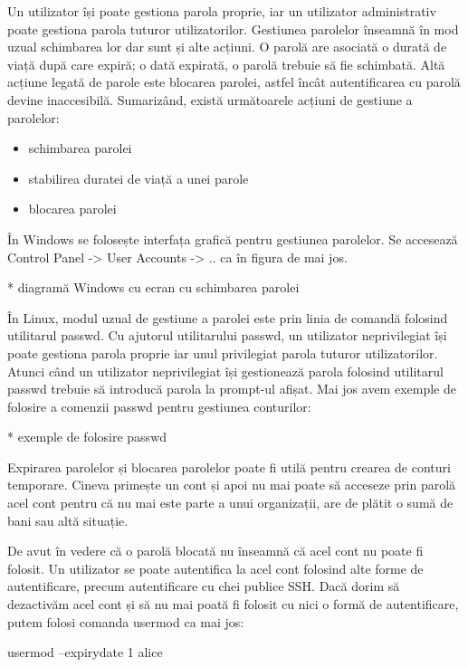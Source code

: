 Un utilizator își poate gestiona parola proprie, iar un utilizator administrativ
poate gestiona parola tuturor utilizatorilor. Gestiunea parolelor înseamnă în
mod uzual schimbarea lor dar sunt și alte acțiuni. O parolă are asociată o
durată de viață după care expiră; o dată expirată, o parolă trebuie să fie
schimbată. Altă acțiune legată de parole este blocarea parolei, astfel încât
autentificarea cu parolă devine inaccesibilă. Sumarizând, există următoarele
acțiuni de gestiune a parolelor:

\begin{itemize}
	\item schimbarea parolei
	\item stabilirea duratei de viață a unei parole
	\item blocarea parolei
\end{itemize}

În Windows se folosește interfața grafică pentru gestiunea parolelor. Se
accesează Control Panel -> User Accounts -> .. ca în figura de mai jos.

* diagramă Windows cu ecran cu schimbarea parolei

În Linux, modul uzual de gestiune a parolei este prin linia de comandă folosind
utilitarul passwd. Cu ajutorul utilitarului passwd, un utilizator neprivilegiat
își poate gestiona parola proprie iar unul privilegiat parola tuturor
utilizatorilor. Atunci când un utilizator neprivilegiat își gestionează parola
folosind utilitarul passwd trebuie să introducă parola la prompt-ul afișat. Mai
jos avem exemple de folosire a comenzii passwd pentru gestiunea conturilor:

* exemple de folosire passwd

Expirarea parolelor și blocarea parolelor poate fi utilă pentru crearea de
conturi temporare. Cineva primește un cont și apoi nu mai poate să acceseze prin
parolă acel cont pentru că nu mai este parte a unui organizații, are de plătit o
sumă de bani sau altă situație.

De avut în vedere că o parolă blocată nu înseamnă că acel cont nu poate fi
folosit. Un utilizator se poate autentifica la acel cont folosind alte forme de
autentificare, precum autentificare cu chei publice SSH. Dacă dorim să
dezactivăm acel cont și să nu mai poată fi folosit cu nici o formă de
autentificare, putem folosi comanda usermod ca mai jos:

\begin{screen}
usermod --expirydate 1 alice
\end{screen}

